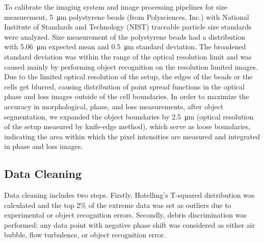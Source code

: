 \documentclass[aps,pra,reprint,superscriptaddress]{revtex4-1}
\begin{document}
To calibrate the imaging system and image processing pipelines for size measurement, \SI{5}{\micro\meter} polystyrene beads (from Polysciences, Inc.) with National Institute of Standards and Technology (NIST) traceable particle size standards were analyzed. Size measurement of the polystyrene beads had a distribution with \SI{5.06}{\micro\meter} expected mean and \SI{0.5}{\micro\meter} standard deviation. The broadened standard deviation was within the range of the optical resolution limit and was caused mainly by performing object recognition on the resolution limited images. Due to the limited optical resolution of the setup, the edges of the beads or the cells get blurred, causing distribution of point spread functions in the optical phase and loss images outside of the cell boundaries. In order to maximize the accuracy in morphological, phase, and loss measurements, after object segmentation, we expanded the object boundaries by \SI{2.5}{\micro\meter} (optical resolution of the setup measured by knife-edge method), which serve as loose boundaries, indicating the area within which the pixel intensities are measured and integrated in phase and loss images.

\subsection*{Data Cleaning}

Data cleaning includes two steps. Firstly, Hotelling's T-squared distribution was calculated and the top 2\% of the extreme data was set as outliers due to experimental or object recognition errors. Secondly, debris discrimination was performed; any data point with negative phase shift was considered as either air bubble, flow turbulence, or object recognition error.

\end{document}
